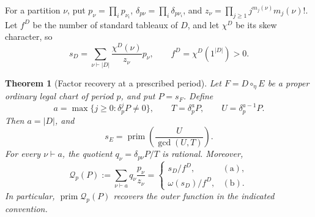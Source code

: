 \documentclass[11pt,a4paper]{amsart}
\numberwithin{equation}{section}
\theoremstyle{plain}
\newtheorem{theorem}{Theorem}[section]
\theoremstyle{definition}
\begin{document}
For a partition \(\nu\), put \(p_\nu=\prod_i p_{\nu_i}\),
\(\delta_{p\nu}=\prod_i\delta_{p\nu_i}\), and
\(z_\nu=\prod_{j\ge1}j^{m_j(\nu)}m_j(\nu)!\).
Let \(f^D\) be the number of standard tableaux of \(D\), and let \(\chi^D\) be its skew character, so
\begin{equation}\label{eq:character}
 s_D=\sum_{\nu\vdash |D|}\frac{\chi^D(\nu)}{z_\nu}p_\nu,
 \qquad f^D=\chi^D(1^{|D|})>0.
\end{equation}

\begin{theorem}[Factor recovery at a prescribed period]\label{thm:extraction}
Let \(F=D\circ_\eta E\) be a proper ordinary legal chart of period \(p\), and put \(P=s_F\).  Define
\begin{equation}\label{eq:terminal}
 a=\max\{j\ge0:\delta_p^jP\ne0\},\qquad
 T=\delta_p^aP,\qquad U=\delta_p^{a-1}P.
\end{equation}
Then \(a=|D|\), and
\begin{equation}\label{eq:inner-recovery}
 s_E=\operatorname{prim}\!\left(\frac{U}{\gcd(U,T)}\right).
\end{equation}
For every \(\nu\vdash a\), the quotient
\(q_\nu=\delta_{p\nu}P/T\) is rational.  Moreover,
\begin{equation}\label{eq:outer-recovery}
 \mathcal Q_p(P):=\sum_{\nu\vdash a}q_\nu\frac{p_\nu}{z_\nu}
 =\begin{cases}
 s_D/f^D,&\mathrm{(a)},\\
 \omega(s_D)/f^D,&\mathrm{(b)}.
 \end{cases}
\end{equation}
In particular, \(\operatorname{prim}\mathcal Q_p(P)\) recovers the outer function in the indicated convention.
\end{theorem}
\end{document}
